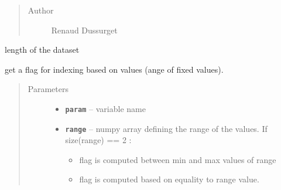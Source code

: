 \documentclass[letterpaper,10pt,english]{sphinxmanual}
\begin{document}
\begin{fulllineitems}
\begin{fulllineitems}
\begin{quote}
\begin{description}
\item[{Author}] \leavevmode
Renaud Dussurget

\end{description}\end{quote}

\end{fulllineitems}


\begin{fulllineitems}
\label{altimetry.data:altimetry.data.hydro_data.size}
length of the dataset

\end{fulllineitems}


\begin{fulllineitems}
\label{altimetry.data:altimetry.data.hydro_data.slice}
get a flag for indexing based on values (ange of fixed values).
\begin{quote}\begin{description}
\item[{Parameters}] \leavevmode\begin{itemize}
\item {} 
\textbf{\texttt{param}} -- variable name

\item {} 
\textbf{\texttt{range}} -- 
numpy array defining the range of the values. If size(range) == 2 :
\begin{itemize}
\item {} 
flag is computed between min and max values of range

\item {} 
flag is computed based on equality to range value.

\end{itemize}


\end{itemize}

\end{description}\end{quote}

\end{fulllineitems}



\end{fulllineitems}
\end{document}
